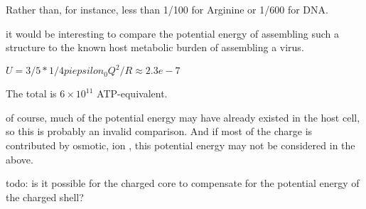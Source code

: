 \documentclass[paper.tex]{subfiles}
\begin{document}
Rather than, for instance, less than 1/100 for Arginine or 1/600 for DNA.



it would be interesting to compare the potential energy of assembling such a structure to the known host metabolic burden of assembling a virus.


$U = 3/5 * 1/4 pi epsilon_0 Q^2 / R \approx 2.3e-7 $

The total is $6 \times 10^11$ ATP-equivalent.


of course, much of the potential energy may have already existed in the host cell, so this is probably an invalid comparison. And if most of the charge is contributed by osmotic, ion , this potential energy may not be considered in the above. 

todo: is it possible for the charged core to compensate for the potential energy of the charged shell?
\end{document}
